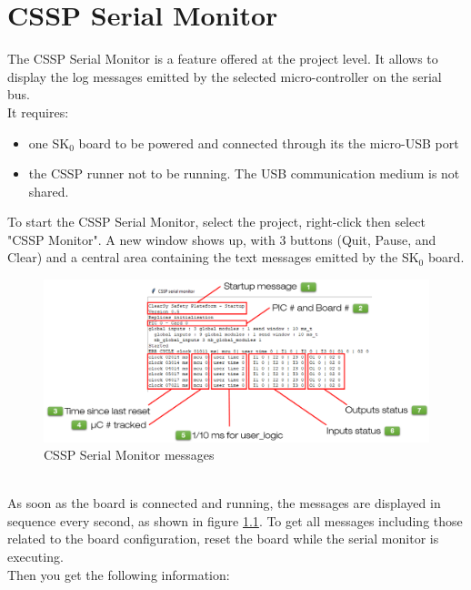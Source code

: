 \chapter{CSSP Serial Monitor}
\label{CSSP Serial Monitor}

The CSSP Serial Monitor is a feature offered at the project level. It allows to display the log messages emitted by the selected micro-controller on the serial bus. \\
It requires:
\begin{itemize}
    \item one SK$_0$ board to be powered and connected through its the micro-USB port
    \item the CSSP runner not to be running. The USB communication medium is not shared.
\end{itemize}
To start the CSSP Serial Monitor, select the project, right-click then select "CSSP Monitor". A new window shows up, with 3 buttons (Quit, Pause, and Clear) and a central area containing the text messages emitted by the SK$_0$ board.
\begin{figure}[h]
\centering\includegraphics[scale=0.30]{Pictures/chapterAnnexes/traces-serial-monitor.png}
\caption{CSSP Serial Monitor messages}
\label{annexes:SK0-serial-monitor}
\end{figure} \\
As soon as the board is connected and running, the messages are displayed in sequence every second, as shown in figure \ref{annexes:SK0-serial-monitor}. To get all messages including those related to the board configuration, reset the board while the serial monitor is executing. \\
Then you get the following information:
